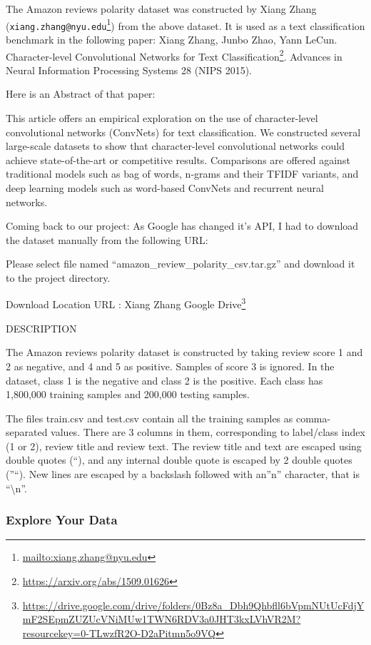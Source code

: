 \documentclass[
]{article}
\DeclareRobustCommand{\href}[2]{#2\footnote{\url{#1}}}
\begin{document}
The Amazon reviews polarity dataset was constructed by Xiang Zhang
(\href{mailto:xiang.zhang@nyu.edu}{\nolinkurl{xiang.zhang@nyu.edu}})
from the above dataset. It is used as a text classification benchmark in
the following paper: Xiang Zhang, Junbo Zhao, Yann LeCun.
\href{https://arxiv.org/abs/1509.01626}{Character-level Convolutional
Networks for Text Classification}. Advances in Neural Information
Processing Systems 28 (NIPS 2015).

Here is an Abstract of that paper:

This article offers an empirical exploration on the use of
character-level convolutional networks (ConvNets) for text
classification. We constructed several large-scale datasets to show that
character-level convolutional networks could achieve state-of-the-art or
competitive results. Comparisons are offered against traditional models
such as bag of words, n-grams and their TFIDF variants, and deep
learning models such as word-based ConvNets and recurrent neural
networks.

Coming back to our project: As Google has changed it's API, I had to
download the dataset manually from the following URL:

Please select file named ``amazon\_review\_polarity\_csv.tar.gz'' and
download it to the project directory.

Download Location URL :
\href{https://drive.google.com/drive/folders/0Bz8a_Dbh9Qhbfll6bVpmNUtUcFdjYmF2SEpmZUZUcVNiMUw1TWN6RDV3a0JHT3kxLVhVR2M?resourcekey=0-TLwzfR2O-D2aPitmn5o9VQ}{Xiang
Zhang Google Drive}

DESCRIPTION

The Amazon reviews polarity dataset is constructed by taking review
score 1 and 2 as negative, and 4 and 5 as positive. Samples of score 3
is ignored. In the dataset, class 1 is the negative and class 2 is the
positive. Each class has 1,800,000 training samples and 200,000 testing
samples.

The files train.csv and test.csv contain all the training samples as
comma-separated values. There are 3 columns in them, corresponding to
label/class index (1 or 2), review title and review text. The review
title and text are escaped using double quotes (``), and any internal
double quote is escaped by 2 double quotes (''``). New lines are escaped
by a backslash followed with an''n'' character, that is
``\textbackslash n''.

\newpage

\hypertarget{explore-your-data}{%
\subsubsection{Explore Your Data}\label{explore-your-data}}
\end{document}
